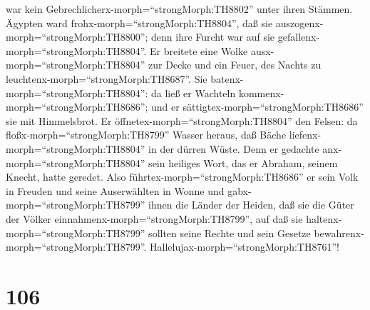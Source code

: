 war kein Gebrechlicherx-morph=``strongMorph:TH8802'' unter ihren
Stämmen.  Ägypten ward frohx-morph=``strongMorph:TH8804'',
daß sie auszogenx-morph=``strongMorph:TH8800''; denn ihre Furcht war auf
sie gefallenx-morph=``strongMorph:TH8804''.  Er breitete
eine Wolke ausx-morph=``strongMorph:TH8804'' zur Decke und ein Feuer,
des Nachts zu leuchtenx-morph=``strongMorph:TH8687''.  Sie
batenx-morph=``strongMorph:TH8804'': da ließ er Wachteln
kommenx-morph=``strongMorph:TH8686''; und er
sättigtex-morph=``strongMorph:TH8686'' sie mit Himmelsbrot.
 Er öffnetex-morph=``strongMorph:TH8804'' den Felsen: da
floßx-morph=``strongMorph:TH8799'' Wasser heraus, daß Bäche
liefenx-morph=``strongMorph:TH8804'' in der dürren Wüste. 
Denn er gedachte anx-morph=``strongMorph:TH8804'' sein heiliges Wort,
das er Abraham, seinem Knecht, hatte geredet.  Also
führtex-morph=``strongMorph:TH8686'' er sein Volk in Freuden und seine
Auserwählten in Wonne  und
gabx-morph=``strongMorph:TH8799'' ihnen die Länder der Heiden, daß sie
die Güter der Völker einnahmenx-morph=``strongMorph:TH8799'',
 auf daß sie haltenx-morph=``strongMorph:TH8799'' sollten
seine Rechte und sein Gesetze bewahrenx-morph=``strongMorph:TH8799''.
Hallelujax-morph=``strongMorph:TH8761''!

\hypertarget{section-105}{%
\section{106}\label{section-105}}

